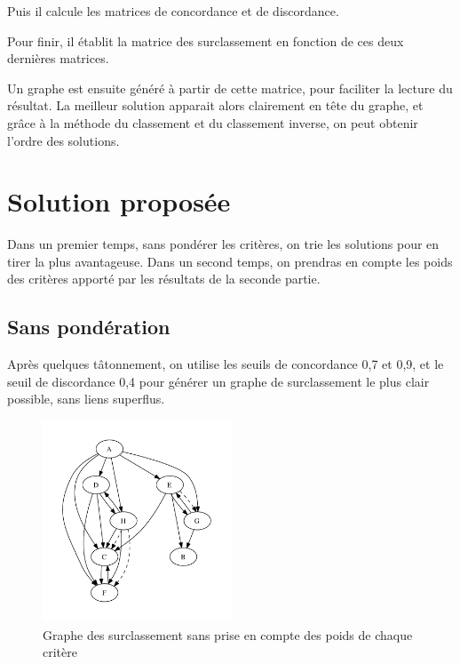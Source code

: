 
Puis il calcule les matrices de concordance et de discordance.



Pour finir, il établit la matrice des surclassement en fonction de ces deux dernières matrices.


Un graphe est ensuite généré à partir de cette matrice, pour faciliter la lecture du résultat.
La meilleur solution apparait alors clairement en tête du graphe, et grâce à la méthode du classement et du classement inverse, on peut obtenir l'ordre des solutions.

\section{Solution proposée}

Dans un premier temps, sans pondérer les critères, on trie les solutions pour en tirer la plus avantageuse. Dans un second temps, on prendras en compte les poids des critères apporté par les résultats de la seconde partie.

\subsection{Sans pondération}

Après quelques tâtonnement, on utilise les seuils de concordance 0,7 et 0,9, et le seuil de discordance 0,4 pour générer un graphe de surclassement le plus clair possible, sans liens superflus.

\clearpage

\begin{figure}[!h]
\begin{center}
\includegraphics[width=0.5\textwidth]{../SourcesMatlab/electre3-1.pdf}
\caption{Graphe des surclassement sans prise en compte des poids de chaque critère}
\end{center}
\end{figure}

